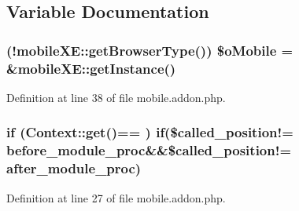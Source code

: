 \subsection{Variable Documentation}
\hypertarget{mobile_8addon_8php_a2e1472c6f1bb5b341e95a632164904d0}{}
\subsubsection[{\$o\+Mobile}]{ (!{\bf mobile\+X\+E\+::get\+Browser\+Type}()) \$o\+Mobile = \&{\bf mobile\+X\+E\+::get\+Instance}()}\label{mobile_8addon_8php_a2e1472c6f1bb5b341e95a632164904d0}


Definition at line 38 of file mobile.\+addon.\+php.

\hypertarget{mobile_8addon_8php_a13d720e0d3597438cb76873850ce4b63}{}
\subsubsection[{if}]{\setlength{\rightskip}{0pt plus 5cm}if ({\bf Context\+::get}(\textquotesingle{})== \textquotesingle{}) if(\$called\+\_\+position!= \textquotesingle{}before\+\_\+module\+\_\+proc\textquotesingle{}\&\&\$called\+\_\+position!= \textquotesingle{}after\+\_\+module\+\_\+proc\textquotesingle{})}\label{mobile_8addon_8php_a13d720e0d3597438cb76873850ce4b63}


Definition at line 27 of file mobile.\+addon.\+php.

